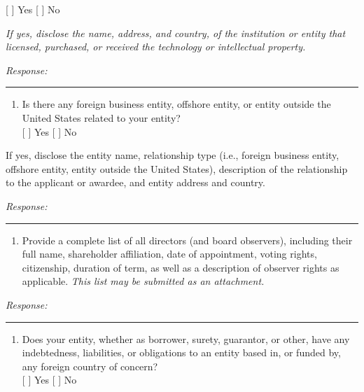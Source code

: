 \documentclass[
]{article}
\providecommand{\tightlist}{%
  \setlength{\itemsep}{0pt}\setlength{\parskip}{0pt}}
\begin{document}
{[} {]} Yes {[} {]} No

\emph{If yes, disclose the name, address, and country, of the
institution or entity that licensed, purchased, or received the
technology or intellectual property.}

\emph{Response:}

\begin{center}\rule{0.5\linewidth}{0.5pt}\end{center}

\begin{enumerate}
\def\labelenumi{\arabic{enumi}.}
\setcounter{enumi}{10}
\tightlist
\item
  Is there any foreign business entity, offshore entity, or entity
  outside the United States related to your entity?\\
  {[} {]} Yes {[} {]} No
\end{enumerate}

If yes, disclose the entity name, relationship type (i.e., foreign
business entity, offshore entity, entity outside the United States),
description of the relationship to the applicant or awardee, and entity
address and country.

\emph{Response:}

\begin{center}\rule{0.5\linewidth}{0.5pt}\end{center}

\begin{enumerate}
\def\labelenumi{\arabic{enumi}.}
\setcounter{enumi}{11}
\tightlist
\item
  Provide a complete list of all directors (and board observers),
  including their full name, shareholder affiliation, date of
  appointment, voting rights, citizenship, duration of term, as well as
  a description of observer rights as applicable. \emph{This list may be
  submitted as an attachment.}
\end{enumerate}

\emph{Response:}

\begin{center}\rule{0.5\linewidth}{0.5pt}\end{center}

\begin{enumerate}
\def\labelenumi{\arabic{enumi}.}
\setcounter{enumi}{12}
\tightlist
\item
  Does your entity, whether as borrower, surety, guarantor, or other,
  have any indebtedness, liabilities, or obligations to an entity based
  in, or funded by, any foreign country of concern?\\
  {[} {]} Yes {[} {]} No
\end{enumerate}
\end{document}
